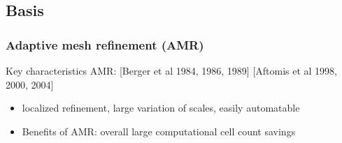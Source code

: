 \documentclass{beamer}
\begin{document}
\subsection{Basis}
\begin{frame}%
\frametitle{Adaptive mesh refinement (AMR)}
\tiny
\begin{minipage}[t][1\textheight]{1\textwidth}
\vspace{-15pt}
\begin{exampleblock}{Key characteristics}
AMR: [Berger et al 1984, 1986, 1989] [Aftomis et al 1998, 2000, 2004]
\begin{itemize}
\tiny
\item localized refinement, large variation of scales, easily automatable
\end{itemize}
\vspace{-20pt}
\begin{figure}
\label{fig:cubeAMRbased}
\centering
{}
\end{figure}
\vspace{-15pt}
\begin{itemize}
\tiny
\item Benefits of AMR: overall large computational cell count savings
\end{itemize}

\end{exampleblock}
\end{minipage}

\end{frame}
\end{document}
